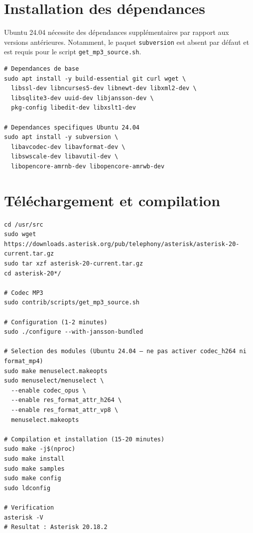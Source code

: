 \documentclass[a4paper,11pt]{report}
\begin{document}
\section{Installation des dépendances}

Ubuntu 24.04 nécessite des dépendances supplémentaires par rapport aux versions antérieures. Notamment, le paquet \texttt{subversion} est absent par défaut et est requis pour le script \texttt{get\_mp3\_source.sh}.

\begin{codebox}
\begin{lstlisting}
# Dependances de base
sudo apt install -y build-essential git curl wget \
  libssl-dev libncurses5-dev libnewt-dev libxml2-dev \
  libsqlite3-dev uuid-dev libjansson-dev \
  pkg-config libedit-dev libxslt1-dev

# Dependances specifiques Ubuntu 24.04
sudo apt install -y subversion \
  libavcodec-dev libavformat-dev \
  libswscale-dev libavutil-dev \
  libopencore-amrnb-dev libopencore-amrwb-dev
\end{lstlisting}
\end{codebox}

\section{Téléchargement et compilation}

\begin{codebox}[bash — Compilation Asterisk 20]
\begin{lstlisting}
cd /usr/src
sudo wget https://downloads.asterisk.org/pub/telephony/asterisk/asterisk-20-current.tar.gz
sudo tar xzf asterisk-20-current.tar.gz
cd asterisk-20*/

# Codec MP3
sudo contrib/scripts/get_mp3_source.sh

# Configuration (1-2 minutes)
sudo ./configure --with-jansson-bundled

# Selection des modules (Ubuntu 24.04 — ne pas activer codec_h264 ni format_mp4)
sudo make menuselect.makeopts
sudo menuselect/menuselect \
  --enable codec_opus \
  --enable res_format_attr_h264 \
  --enable res_format_attr_vp8 \
  menuselect.makeopts

# Compilation et installation (15-20 minutes)
sudo make -j$(nproc)
sudo make install
sudo make samples
sudo make config
sudo ldconfig

# Verification
asterisk -V
# Resultat : Asterisk 20.18.2
\end{lstlisting}
\end{codebox}
\end{document}
